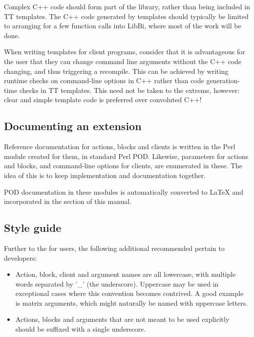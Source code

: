 Complex C++ code should form part of the library, rather than being included
in TT templates. The C++ code generated by templates should typically be
limited to arranging for a few function calls into LibBi, where most of the
work will be done.

When writing templates for client programs, consider that it is advantageous
for the user that they can change command line arguments without the C++ code
changing, and thus triggering a recompile. This can be achieved by writing
runtime checks on command-line options in C++ rather than code generation-time
checks in TT templates. This need not be taken to the extreme, however: clear
and simple template code is preferred over convoluted C++!

\subsection{Documenting an extension\label{Documenting_an_extension}}

Reference documentation for actions, blocks and clients is written in the Perl
module created for them, in standard Perl POD. Likewise, parameters for
actions and blocks, and command-line options for clients, are enumerated in
these. The idea of this is to keep implementation and documentation together.

POD documentation in these modules is automatically converted to LaTeX and
incorporated in the  section of this
manual.

\subsection{Style guide\label{Developer_style_guide}}

Further to the  for users, the
following additional recommended pertain to developers:
\begin{itemize}
\item Action, block, client and argument names are all lowercase, with
  multiple words separated by '\_' (the underscore). Uppercase may be used in
  exceptional cases where this convention becomes contrived. A good example is
  matrix arguments, which might naturally be named with uppercase letters.
\item Actions, blocks and arguments that are not meant to be used explicitly
  should be suffixed with a single underscore.
\end{itemize}

